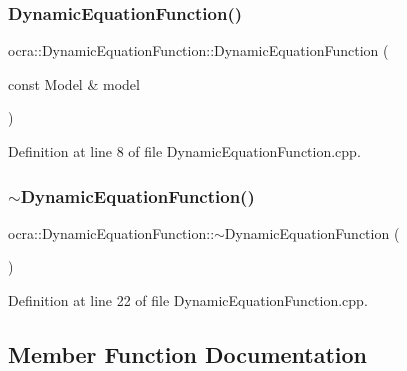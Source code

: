 \subsubsection{\texorpdfstring{Dynamic\+Equation\+Function()}{DynamicEquationFunction()}}
{\footnotesize\ttfamily ocra\+::\+Dynamic\+Equation\+Function\+::\+Dynamic\+Equation\+Function (\begin{DoxyParamCaption}\item[{const Model \&}]{model }\end{DoxyParamCaption})}



Definition at line 8 of file Dynamic\+Equation\+Function.\+cpp.

\hypertarget{classocra_1_1DynamicEquationFunction_a84c82f21c1564aaca6b5aa703ecae73e}{}\label{classocra_1_1DynamicEquationFunction_a84c82f21c1564aaca6b5aa703ecae73e} 
\subsubsection{\texorpdfstring{$\sim$\+Dynamic\+Equation\+Function()}{~DynamicEquationFunction()}}
{\footnotesize\ttfamily ocra\+::\+Dynamic\+Equation\+Function\+::$\sim$\+Dynamic\+Equation\+Function (\begin{DoxyParamCaption}{ }\end{DoxyParamCaption})}



Definition at line 22 of file Dynamic\+Equation\+Function.\+cpp.



\subsection{Member Function Documentation}
\hypertarget{classocra_1_1DynamicEquationFunction_a6fc52fcd947fa303e55729dbb286b92c}{}\label{classocra_1_1DynamicEquationFunction_a6fc52fcd947fa303e55729dbb286b92c} 
